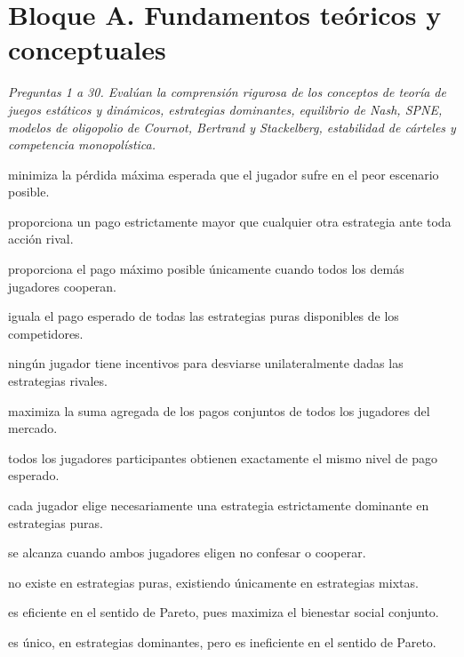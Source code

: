 \section*{Bloque A. Fundamentos teóricos y conceptuales}

\noindent\textit{Preguntas 1 a 30. Evalúan la comprensión rigurosa de los conceptos de teoría de juegos estáticos y dinámicos, estrategias dominantes, equilibrio de Nash, SPNE, modelos de oligopolio de Cournot, Bertrand y Stackelberg, estabilidad de cárteles y competencia monopolística.}

\begin{opts}
    \item minimiza la pérdida máxima esperada que el jugador sufre en el peor escenario posible.
    \item proporciona un pago estrictamente mayor que cualquier otra estrategia ante toda acción rival.
    \item proporciona el pago máximo posible únicamente cuando todos los demás jugadores cooperan.
    \item iguala el pago esperado de todas las estrategias puras disponibles de los competidores.
\end{opts}

\begin{opts}
    \item ningún jugador tiene incentivos para desviarse unilateralmente dadas las estrategias rivales.
    \item maximiza la suma agregada de los pagos conjuntos de todos los jugadores del mercado.
    \item todos los jugadores participantes obtienen exactamente el mismo nivel de pago esperado.
    \item cada jugador elige necesariamente una estrategia estrictamente dominante en estrategias puras.
\end{opts}

\begin{opts}
    \item se alcanza cuando ambos jugadores eligen no confesar o cooperar.
    \item no existe en estrategias puras, existiendo únicamente en estrategias mixtas.
    \item es eficiente en el sentido de Pareto, pues maximiza el bienestar social conjunto.
    \item es único, en estrategias dominantes, pero es ineficiente en el sentido de Pareto.
\end{opts}

